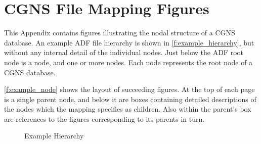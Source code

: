 \section{CGNS File Mapping Figures}
\label{s:figures}
\thispagestyle{plain}

This Appendix contains figures illustrating the nodal structure of
a CGNS database.
An example ADF file hierarchy is shown in \autoref{f:example_hierarchy},
but without any internal detail of the individual nodes.
Just below the ADF root node is a  node, and
one or more  nodes.
Each  node represents the root node of a CGNS database.

\autoref{f:example_node} shows the layout of succeeding figures.
At the top of each page is a single parent node, and below it are boxes
containing detailed descriptions of the nodes which the mapping specifies
as children.
Also within the parent's box are references to the figures corresponding
to its parents in turn.

\renewcommand{\topfraction}{1.00}
\renewcommand{\bottomfraction}{1.00}
\renewcommand{\textfraction}{0.0}
\setlength{\unitlength}{1em}	%

\newlength{\indName}
\newlength{\indLabel}
\newlength{\indDimensions}
\newlength{\indDimensionValues}
\newlength{\indData}
\newlength{\indParameters}
\newlength{\indFunctions}
\newlength{\indChildNodes}
\newlength{\indbullet}
\newlength{\spacea}
\newlength{\spaceb}
\newlength{\spacec}
\settowidth{\indbullet}{\textbullet ~~}
\setlength{\spacea}{\indDimensionValues-\indChildNodes}
\setlength{\spaceb}{\indDimensions-\indParameters+5em}
\setlength{\spacec}{\indDimensions-\indFunctions+5em}

\newlength{\textmcap}
\setlength{\textmcap}{\textheight-\abovecaptionskip-\baselineskip}

\begin{landscape}
\begin{figure}[!htp]
\centering
\resizebox{\linewidth}{!}{}
\caption{Example Hierarchy}
\label{f:example_hierarchy}
\end{figure}
\end{landscape}

